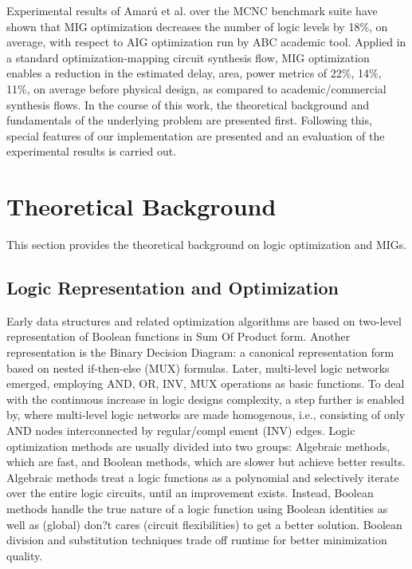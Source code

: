 \documentclass[
	accentcolor=1c,%
	type=intern,
	marginpar=false,
	ruledheaders=section,
	class=report,
	BCOR=5mm,
      parskip=half-,
	fontsize=10pt
	]{tudapub}
\begin{document}
		Experimental results of Amarú et al. over the MCNC benchmark suite have shown that MIG optimization decreases the
		number of logic levels by 18\%, on average, with respect to AIG optimization run by ABC academic
		tool. Applied in a standard optimization-mapping circuit synthesis flow, MIG optimization enables
		a reduction in the estimated {delay, area, power} metrics of {22\%, 14\%, 11\%},  on average before physical
		design, as compared to academic/commercial synthesis flows.
		\newline
		\newline
		In the course of this work, the theoretical background and fundamentals of the underlying problem are presented first.
		Following this, special features of our implementation are presented and an evaluation of the experimental results is carried out.

	\newpage
	\section{Theoretical Background}

		This section provides the theoretical background on logic optimization and MIGs.
		\newline
		\subsection*{Logic Representation and Optimization}

		Early data structures and related optimization algorithms are based on two-level representation
		of Boolean functions in Sum Of Product form. Another representation is the Binary Decision Diagram:
		a canonical representation form based on nested if-then-else (MUX) formulas. Later, multi-level logic
		networks emerged, employing AND, OR, INV, MUX operations as basic functions. To deal with the
		continuous increase in logic designs complexity, a step further is enabled by, where multi-level logic
		networks are made homogenous, i.e., consisting of only AND nodes interconnected by regular/compl
		ement (INV) edges.
		\newline
		\newline
		Logic optimization methods are usually divided into two groups: Algebraic methods, which are fast, and
		Boolean methods, which are slower but achieve better results. Algebraic methods treat a logic functions as a
		polynomial and selectively iterate over the entire logic circuits, until an improvement exists. Instead, Boolean
		methods handle the true nature of a logic function using Boolean identities as well as (global) don?t cares
		(circuit flexibilities) to get a better solution. Boolean division and substitution techniques trade off runtime
		for better minimization quality.
		\newline
\end{document}
